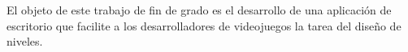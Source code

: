 El objeto de este trabajo de fin de grado es el desarrollo de una aplicación de escritorio que facilite a los desarrolladores de videojuegos la tarea del diseño de niveles.



